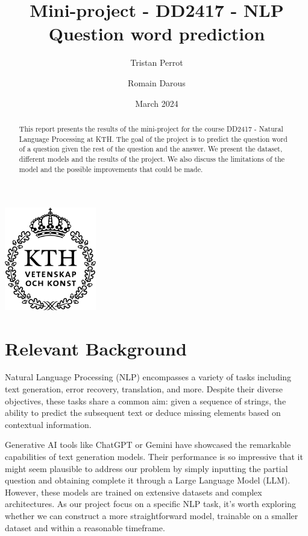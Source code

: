\documentclass{article}
\title{Mini-project - DD2417 - NLP \\ Question word prediction}
\author{Tristan Perrot \and Romain Darous}
\date{March 2024}
\begin{document}
\maketitle
\begin{center}
    \includegraphics[width = 40mm]{images/KTH_logo_RGB_svart.png}
\end{center}

\begin{abstract}
    This report presents the results of the mini-project for the course DD2417 - Natural Language Processing at KTH. The goal of the project is to predict the question word of a question given the rest of the question and the answer. We present the dataset, different models and the results of the project. We also discuss the limitations of the model and the possible improvements that could be made.
\end{abstract}

\section{Relevant Background}

Natural Language Processing (NLP) encompasses a variety of tasks including text generation, error recovery, translation, and more. Despite their diverse objectives, these tasks share a common aim: given a sequence of strings, the ability to predict the subsequent text or deduce missing elements based on contextual information.

Generative AI tools like ChatGPT or Gemini have showcased the remarkable capabilities of text generation models. Their performance is so impressive that it might seem plausible to address our problem by simply inputting the partial question and obtaining complete it through a Large Language Model (LLM). However, these models are trained on extensive datasets and complex architectures. As our project focus on a specific NLP task, it's worth exploring whether we can construct a more straightforward model, trainable on a smaller dataset and within a reasonable timeframe.
\end{document}
